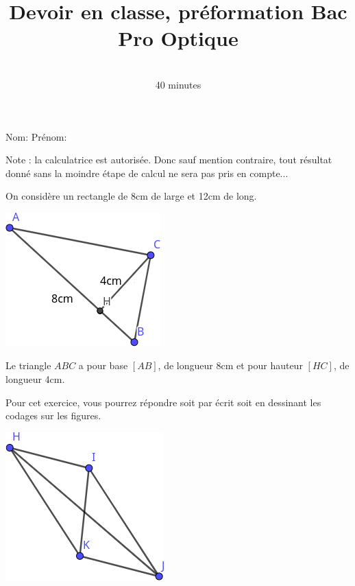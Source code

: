 \documentclass[a4paper,12pt]{scrartcl}
\date{}
\title{Devoir en classe, préformation Bac Pro Optique}
\author{\rotatebox{10}{\textsc{Géométrie}} \\ 40 minutes}
\begin{document}
\maketitle

{\Large Nom:} 
\hspace{60mm}
{\Large Prénom:}
\vspace{6mm}

Note : la calculatrice est autorisée. Donc sauf mention contraire, tout résultat donné sans la moindre étape de calcul ne sera pas pris en compte...

On considère un rectangle de 8cm de large et 12cm de long.




\begin{center}
\includegraphics[width=0.3\linewidth]{pics/triangle.png}
\end{center}

Le triangle $ABC$ a pour base $[AB]$, de longueur 8cm et pour hauteur $[HC]$, de longueur 4cm. 





Pour cet exercice, vous pourrez répondre soit par écrit soit en dessinant les codages sur les figures.


\begin{center}
\includegraphics[width=0.3\linewidth]{pics/parallelogramme.png}
\end{center}
\end{document}
